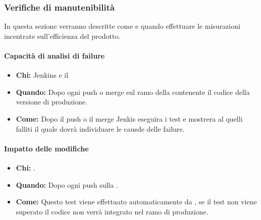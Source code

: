 \newpage
\subsubsection{Verifiche di manutenibilità}
In questa sezione verranno descritte come e quando effettuare le misurazioni incentrate sull'efficienza del prodotto.

\paragraph{Capacità di analisi di failure}
\begin{itemize}
\item \textbf{Chi:} Jenkins e il \Prog
\item \textbf{Quando:} Dopo ogni push o merge sul ramo della  contenente il codice della versione di produzione.
\item \textbf{Come:} Dopo il push o il merge Jenkis eseguira i test e mostrera al \Prog quelli falliti il quale dovrà individuare le causde delle failure.
\end{itemize}

\paragraph{Impatto delle modifiche}
\begin{itemize}
\item \textbf{Chi:} .
\item \textbf{Quando:} Dopo ogni push sulla .
\item \textbf{Come:} Questo test viene effettuato automaticamente da , se il test non viene superato il codice non verrà integrato nel ramo di produzione.
\end{itemize}
